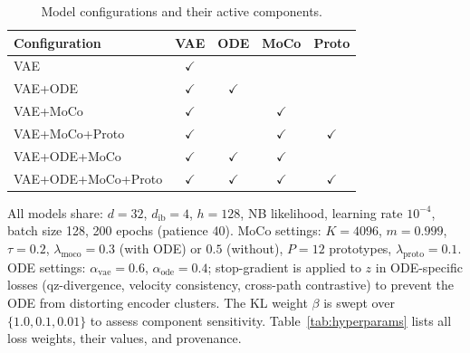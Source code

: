 \documentclass[journal]{IEEEtran}
\begin{document}
\begin{table}[!t]
    \centering
    \caption{Model configurations and their active components.}
    \label{tab:configs}
    \begin{tabular}{lcccc}
        \toprule
        Configuration   & VAE          & ODE          & MoCo         & Proto \\
        \midrule
        VAE             & $\checkmark$ &              &              &              \\
        VAE+ODE         & $\checkmark$ & $\checkmark$ &              &              \\
        VAE+MoCo        & $\checkmark$ &              & $\checkmark$ &              \\
        VAE+MoCo+Proto  & $\checkmark$ &              & $\checkmark$ & $\checkmark$ \\
        VAE+ODE+MoCo    & $\checkmark$ & $\checkmark$ & $\checkmark$ &              \\
        VAE+ODE+MoCo+Proto & $\checkmark$ & $\checkmark$ & $\checkmark$ & $\checkmark$ \\
        \bottomrule
    \end{tabular}
\end{table}

All models share: $d = 32$, $d_{\mathrm{ib}} = 4$, $h = 128$, NB likelihood, learning rate $10^{-4}$, batch size 128, 200 epochs (patience 40). MoCo settings: $K = 4096$, $m = 0.999$, $\tau = 0.2$, $\lambda_{\mathrm{moco}} = 0.3$ (with ODE) or $0.5$ (without), $P = 12$ prototypes, $\lambda_{\mathrm{proto}} = 0.1$. ODE settings: $\alpha_{\mathrm{vae}} = 0.6$, $\alpha_{\mathrm{ode}} = 0.4$; stop-gradient is applied to $z$ in ODE-specific losses (qz-divergence, velocity consistency, cross-path contrastive) to prevent the ODE from distorting encoder clusters. The KL weight $\beta$ is swept over $\{1.0, 0.1, 0.01\}$ to assess component sensitivity. Table~\ref{tab:hyperparams} lists all loss weights, their values, and provenance.
\end{document}
